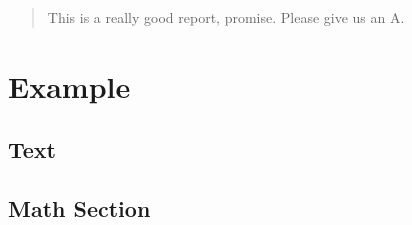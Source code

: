 \documentclass[12pt, fleqn]{report}
\begin{document}
\begingroup
\thispagestyle{empty}

\endgroup


\begin{abstract}
This is a really good report, promise. Please give us an A.
\end{abstract}

\usechapterimagefalse


\printnomenclature


\pagestyle{empty}
\tableofcontents
\pagestyle{fancy}

\usechapterimagetrue
{}

\chapter{Example} \label{cha:example}
\section{Text} \label{sec:text}
\lipsum[1-7]
\section{Math Section} \label{sec:math_section}
\blindmathpaper






\end{document}
